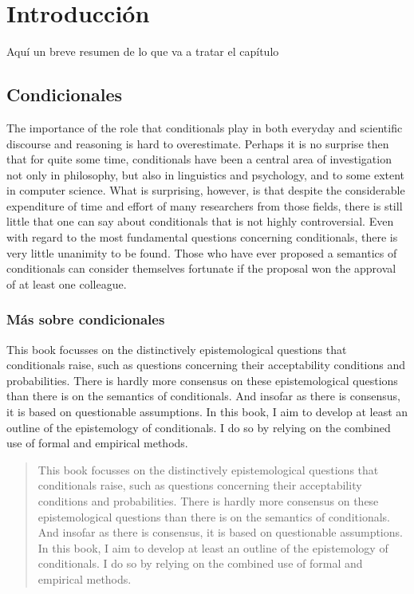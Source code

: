 
\chapter{Introducción}
\noindent Aquí un breve resumen de lo que va a tratar el capítulo

\section{Condicionales}

\noindent The importance of the role that conditionals play in both everyday and scientific discourse and reasoning is hard to overestimate. \citep{Ariotti1968} %
Perhaps it is no surprise then that for quite some time, conditionals have been a central area of investigation not only in philosophy, but also in linguistics and psychology, and to some extent in computer science.
What is surprising, however, is that despite the considerable expenditure of time and effort of many researchers from those fields, there is still little that one can say about conditionals that is not highly controversial. 
Even with regard to the most fundamental questions concerning conditionals, there is very little unanimity to be found. 
Those who have ever proposed a semantics of conditionals can consider themselves fortunate if the proposal won the approval of at least one colleague. %

\subsection{Más sobre condicionales}

\noindent This book focusses on the distinctively epistemological questions that conditionals raise, such as questions concerning their acceptability conditions and probabilities.
There is hardly more consensus on these epistemological questions than there is on the semantics of conditionals.
And insofar as there is consensus, it is based on questionable assumptions.
In this book, I aim to develop at least an outline of the epistemology of conditionals. 
I do so by relying on the combined use of formal and empirical methods.

\begin{quote}
    This book focusses on the distinctively epistemological questions that conditionals raise, such as questions concerning their acceptability conditions and probabilities.
    There is hardly more consensus on these epistemological questions than there is on the semantics of conditionals.
    And insofar as there is consensus, it is based on questionable assumptions.
    In this book, I aim to develop at least an outline of the epistemology of conditionals. 
    I do so by relying on the combined use of formal and empirical methods. \citep{Blaasjoe2022}
\end{quote}

